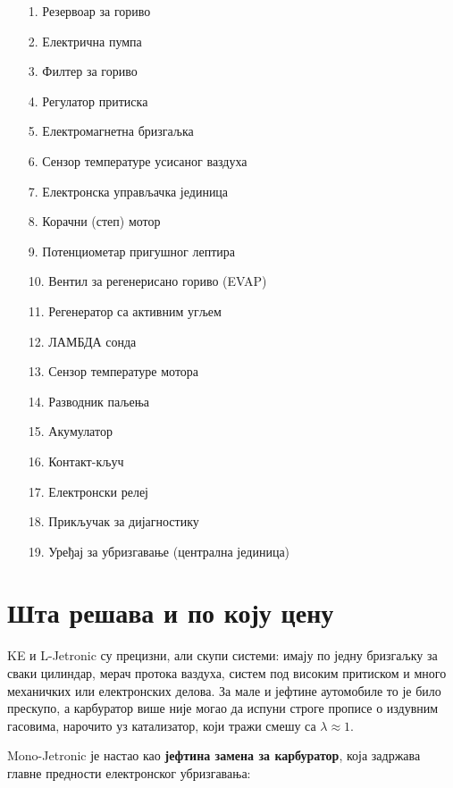 \documentclass{report}
\begin{document}
\begin{kljucno}

      \begin{enumerate}[noitemsep]
    \item[1.] Резервоар за гориво
    \item[2.] Електрична пумпа
    \item[3.] Филтер за гориво
    \item[4.] Регулатор притиска
    \item[5.] Електромагнетна бризгаљка
    \item[6.] Сензор температуре усисаног ваздуха
    \item[7.] Електронска управљачка јединица
    \item[8.] Корачни (степ) мотор
    \item[9.] Потенциометар пригушног лептира
    \item[10.] Вентил за регенерисано гориво (EVAP)
    \item[11.] Регенератор са активним угљем
    \item[12.] ЛАМБДА сонда
    \item[13.] Сензор температуре мотора
    \item[14.] Разводник паљења
    \item[15.] Акумулатор
    \item[16.] Контакт-кључ
    \item[17.] Електронски релеј
    \item[18.] Прикључак за дијагностику
    \item[19.] Уређај за убризгавање (централна јединица)
\end{enumerate}
      
\end{kljucno}

\section{Шта решава и по коју цену}

KE и L-Jetronic су прецизни, али скупи системи: имају по једну бризгаљку за сваки
цилиндар, мерач протока ваздуха, систем под високим притиском и много
механичких или електронских делова. За мале и јефтине аутомобиле то је било
прескупо, а карбуратор више није могао да испуни строге прописе о издувним
гасовима, нарочито уз катализатор, који тражи смешу са $\lambda \approx 1$.

Mono-Jetronic је настао као \textbf{јефтина замена за карбуратор}, која задржава
главне предности електронског убризгавања:
\end{document}
